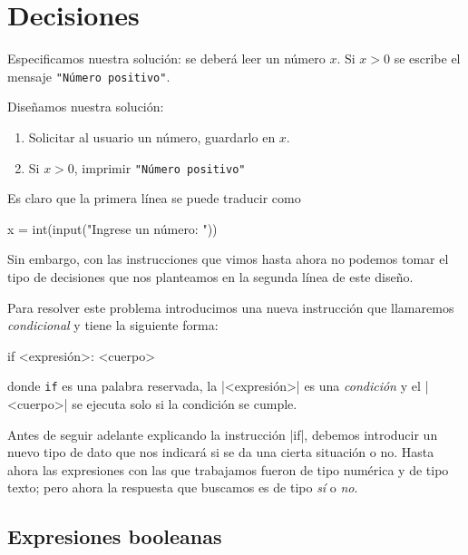 \chapter{Decisiones}


\begin{solucion}
Especificamos nuestra solución: se deberá leer un número $x$.
Si $x > 0$ se escribe el mensaje \lstinline!"Número positivo"!.

Diseñamos nuestra solución:

\begin{enumerate}
\item Solicitar al usuario un número, guardarlo en $x$.
\item Si $x > 0$, imprimir \lstinline!"Número positivo"!
\end{enumerate}

Es claro que la primera línea se puede traducir como
\begin{codigo-python-sn}
    x = int(input("Ingrese un número: "))
\end{codigo-python-sn}

Sin embargo, con las instrucciones que vimos hasta ahora no podemos tomar
el tipo de decisiones que nos planteamos en la segunda línea de este
diseño.
\end{solucion}

Para resolver este problema introducimos una nueva instrucción que
llamaremos \emph{condicional} y tiene la siguiente forma:
\begin{codigo-python-sn}
if <expresión>:
    <cuerpo>
\end{codigo-python-sn}
donde \lstinline+if+ es una palabra reservada, la |<expresión>| es una
\emph{condición} y el |<cuerpo>| se ejecuta solo si la condición se cumple.

Antes de seguir adelante explicando la instrucción |if|, debemos introducir
un nuevo tipo de dato que nos indicará si se da una cierta situación o no.
Hasta ahora las expresiones con las que trabajamos fueron de tipo numérica y de
tipo texto; pero ahora la respuesta que buscamos es de tipo \emph{sí} o \emph{no}.

\section{Expresiones booleanas}

